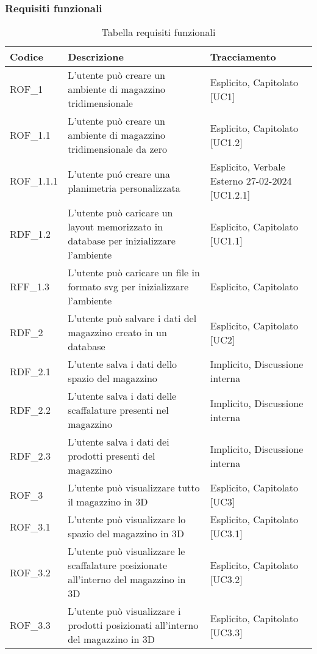 \subsubsection{Requisiti funzionali}\label{subsec:requisiti_funzionali}
\renewcommand{\arraystretch}{2.5}
\begin{xltabular}{\textwidth}{ p{0.1\textwidth} | X | p{0.3\textwidth} }
    \textbf{\color{white} Codice} & \textbf{\color{white} Descrizione} & \textbf{\color{white} Tracciamento} \\ 
    \endhead

    \caption{Tabella requisiti funzionali} 
    \endlastfoot

    ROF\_1 & L'utente può creare un ambiente di magazzino tridimensionale & Esplicito, Capitolato [UC1]\\
    ROF\_1.1 & L'utente può creare un ambiente di magazzino tridimensionale da zero & Esplicito, Capitolato [UC1.2]\\
    ROF\_1.1.1 & L'utente puó creare una planimetria personalizzata & Esplicito, Verbale Esterno 27-02-2024 [UC1.2.1]\\
    RDF\_1.2 & L'utente può caricare un layout memorizzato in database per inizializzare l'ambiente & Esplicito, Capitolato [UC1.1]\\
    RFF\_1.3 & L'utente può caricare un file in formato svg per inizializzare l'ambiente & Esplicito, Capitolato \\
    RDF\_2 & L'utente può salvare i dati del magazzino creato in un database & Esplicito, Capitolato [UC2]\\  
    RDF\_2.1 & L'utente salva i dati dello spazio del magazzino & Implicito, Discussione interna \\  
    RDF\_2.2 & L'utente salva i dati delle scaffalature presenti nel magazzino & Implicito, Discussione interna \\  
    RDF\_2.3 & L'utente salva i dati dei prodotti presenti del magazzino & Implicito, Discussione interna \\    
    ROF\_3 & L'utente può visualizzare tutto il magazzino in 3D & Esplicito, Capitolato [UC3]\\
    ROF\_3.1 & L'utente può visualizzare lo spazio del magazzino in 3D & Esplicito, Capitolato [UC3.1]\\
    ROF\_3.2 & L'utente può visualizzare le scaffalature posizionate all'interno del magazzino in 3D & Esplicito, Capitolato [UC3.2]\\
    ROF\_3.3 & L'utente può visualizzare i prodotti posizionati all'interno del magazzino in 3D & Esplicito, Capitolato [UC3.3]\\

\end{xltabular}
